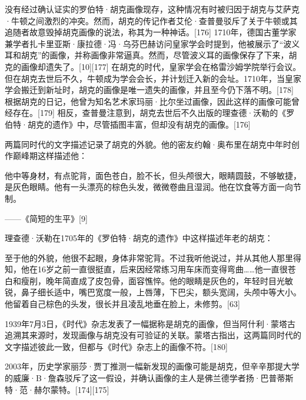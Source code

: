 没有经过确认证实的罗伯特·胡克画像现存，这种情况有时被归因于胡克与艾萨克·牛顿之间激烈的冲突。然而，胡克的传记作者艾伦·查普曼驳斥了关于牛顿或其追随者故意毁掉胡克画像的说法，称其为一种神话。[176] 1710年，德国古董学家兼学者扎卡里亚斯·康拉德·冯·乌芬巴赫访问皇家学会时提到，他被展示了“波义耳和胡克”的画像，并称画像非常逼真。然而，尽管波义耳的画像保存了下来，胡克的画像却遗失了。[10][177] 在胡克的时代，皇家学会在格雷沙姆学院举行会议。但在胡克去世后不久，牛顿成为学会会长，并计划迁入新的会址。1710年，当皇家学会搬迁到新址时，胡克的画像是唯一遗失的画像，并且至今仍下落不明。[178] 根据胡克的日记，他曾为知名艺术家玛丽·比尔坐过画像，因此这样的画像可能曾经存在。[179] 相反，查普曼注意到，胡克去世后不久出版的理查德·沃勒的《罗伯特·胡克的遗作》中，尽管插图丰富，但却没有胡克的画像。[176]

两篇同时代的文字描述记录了胡克的外貌。他的密友约翰·奥布里在胡克中年时创作巅峰期这样描述他：

他中等身材，有点驼背，面色苍白，脸不长，但头颅很大，眼睛圆鼓，不够敏捷，是灰色眼睛。他有一头漂亮的棕色头发，微微卷曲且湿润。他在饮食等方面一向节制。

——《简短的生平》[9]

理查德·沃勒在1705年的《罗伯特·胡克的遗作》中这样描述年老的胡克：

至于他的外貌，他很不起眼，身体非常驼背。不过我听他说过，并从其他人那里得知，他在16岁之前一直很挺直，后来因经常练习用车床而变得弯曲……他一直很苍白和瘦削，晚年简直成了皮包骨，面容憔悴。他的眼睛是灰色的，年轻时目光敏锐，鼻子细长适中，嘴巴宽度一般，上唇薄，下巴尖，额头宽阔，头颅中等大小。他留着自己棕色的头发，很长并且凌乱地垂在脸上，未修剪。[63]

1939年7月3日，《时代》杂志发表了一幅据称是胡克的画像，但当阿什利·蒙塔古追溯其来源时，发现画像与胡克没有可验证的关联。蒙塔古指出，这两篇同时代的文字描述彼此一致，但都与《时代》杂志上的画像不符。[180]

2003年，历史学家丽莎·贾丁推测一幅新发现的画像可能是胡克，但辛辛那提大学的威廉·B·詹森驳斥了这一假设，并确认画像的主人是佛兰德学者扬·巴普蒂斯特·范·赫尔蒙特。[174][175]